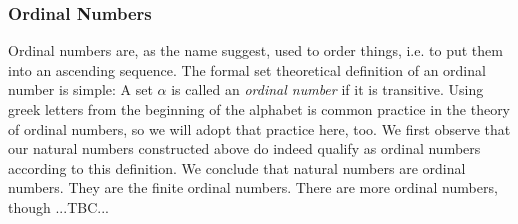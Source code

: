 \subsubsection{Ordinal Numbers}
Ordinal numbers are, as the name suggest, used to order things, i.e. to put them into an ascending sequence. The formal set theoretical definition of an ordinal number is simple: A set $\alpha$ is called an \emph{ordinal number} if it is transitive. Using greek letters from the beginning of the alphabet is common practice in the theory of ordinal numbers, so we will adopt that practice here, too. We first observe that our natural numbers constructed above do indeed qualify as ordinal numbers according to this definition. We conclude that natural numbers are ordinal numbers. They are the finite ordinal numbers. There are more ordinal numbers, though ...TBC...








